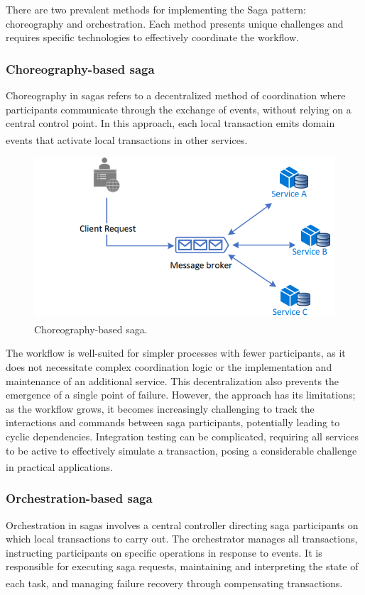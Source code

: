 There are two prevalent methods for implementing the Saga pattern: choreography and orchestration.
Each method presents unique challenges and requires specific technologies to effectively coordinate
the workflow.

\subsubsection{Choreography-based saga}
Choreography in sagas refers to a decentralized method of coordination where participants
communicate through the exchange of events, without relying on a central control point. In this
approach, each local transaction emits domain events that activate local transactions in
other services\textsuperscript{\cite{ms_sagas}}.

\begin{figure}
    \centering
    \includegraphics[scale=0.55]{Pictures/3_choreography.png}
    \caption{Choreography-based saga\textsuperscript{\cite{ms_sagas}}.}
    \label{fig:3_choreography}
\end{figure}

The workflow is well-suited for simpler processes with fewer participants, as it does not
necessitate complex coordination logic or the implementation and maintenance of an additional
service. This decentralization also prevents the emergence of a single point of failure. However,
the approach has its limitations; as the workflow grows, it becomes increasingly challenging to
track the interactions and commands between saga participants, potentially leading to cyclic
dependencies. Integration testing can be complicated, requiring all services to be
active to effectively simulate a transaction, posing a considerable challenge in practical
applications\textsuperscript{\cite{ms_sagas}}.

\subsubsection{Orchestration-based saga}
Orchestration in sagas involves a central controller directing saga participants on which local
transactions to carry out. The orchestrator manages all transactions, instructing participants on
specific operations in response to events. It is responsible for executing saga requests,
maintaining and interpreting the state of each task, and managing failure recovery through
compensating transactions\textsuperscript{\cite{ms_sagas}}.

